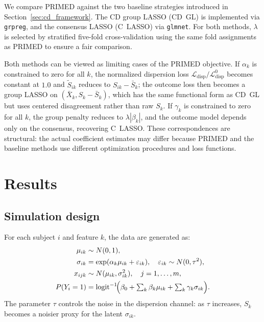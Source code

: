 \documentclass[referee,lineno,pdflatex,sn-vancouver-num]{sn-jnl}
\begin{document}
We compare PRIMED against the two baseline strategies introduced in Section~\ref{sec:cd_framework}.
The CD group LASSO (CD~GL) is implemented via \texttt{grpreg}, and the consensus LASSO (C~LASSO) via \texttt{glmnet}.
For both methods, $\lambda$ is selected by stratified five-fold cross-validation using the same fold assignments as PRIMED to ensure a fair comparison.

Both methods can be viewed as limiting cases of the PRIMED objective.
If $\alpha_k$ is constrained to zero for all $k$, the normalized dispersion loss $\mathcal{L}_{\mathrm{disp}}/\mathcal{L}_{\mathrm{disp}}^0$ becomes constant at $1.0$ and $\tilde S_{ik}$ reduces to $S_{ik} - \bar S_k$; the outcome loss then becomes a group LASSO on $(\bar X_k, S_k - \bar S_k)$, which has the same functional form as CD~GL but uses centered disagreement rather than raw $S_k$.
If $\gamma_k$ is constrained to zero for all $k$, the group penalty reduces to $\lambda|\beta_k|$, and the outcome model depends only on the consensus, recovering C~LASSO.
These correspondences are structural: the actual coefficient estimates may differ because PRIMED and the baseline methods use different optimization procedures and loss functions.


\section{Results}\label{sec:results}

\subsection{Simulation design}\label{sec:sim_design}

For each subject $i$ and feature $k$, the data are generated as:
\begin{align}
  \mu_{ik} &\sim N(0,1), \notag \\
  \sigma_{ik} &= \exp(\alpha_k \mu_{ik} + \varepsilon_{ik}), \quad \varepsilon_{ik} \sim N(0, \tau^2), \label{eq:dgp} \\
  x_{ijk} &\sim N(\mu_{ik}, \sigma_{ik}^2), \quad j=1,\dots,m, \notag \\
  P(Y_i = 1) &= \mathrm{logit}^{-1}\!\Bigl(\beta_0 + \textstyle\sum_k \beta_k \mu_{ik} + \sum_k \gamma_k \sigma_{ik}\Bigr). \notag
\end{align}
The parameter $\tau$ controls the noise in the dispersion channel: as $\tau$ increases, $S_k$ becomes a noisier proxy for the latent $\sigma_{ik}$.
\end{document}
